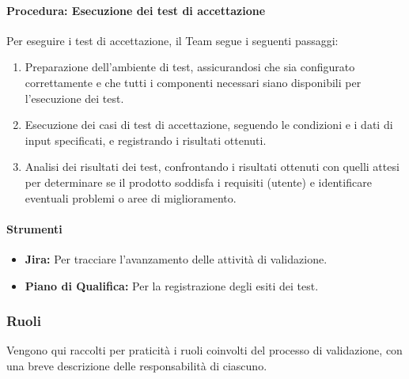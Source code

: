 \documentclass[a4paper,12pt]{article}
\begin{document}
\paragraph{Procedura: Esecuzione dei test di accettazione}
Per eseguire i test di accettazione, il Team segue i seguenti passaggi:
\begin{enumerate}
    \item Preparazione dell'ambiente di test, assicurandosi che sia configurato
          correttamente e che tutti i componenti necessari siano disponibili per
          l'esecuzione dei test.
    \item Esecuzione dei casi di test di accettazione, seguendo le condizioni e i dati di
          input specificati, e registrando i risultati ottenuti.
    \item Analisi dei risultati dei test, confrontando i risultati ottenuti con quelli
          attesi per determinare se il prodotto soddisfa i requisiti (utente) e identificare
          eventuali problemi o aree di miglioramento.
\end{enumerate}

\paragraph{Strumenti}
\begin{itemize}
    \item \textbf{Jira:} Per tracciare l'avanzamento delle attività di validazione.
    \item \textbf{Piano di Qualifica:} Per la registrazione degli esiti dei test.
\end{itemize}

\subsubsection{Ruoli}
Vengono qui raccolti per praticità i ruoli coinvolti del processo di
validazione, con una breve descrizione delle responsabilità di ciascuno.
\end{document}
